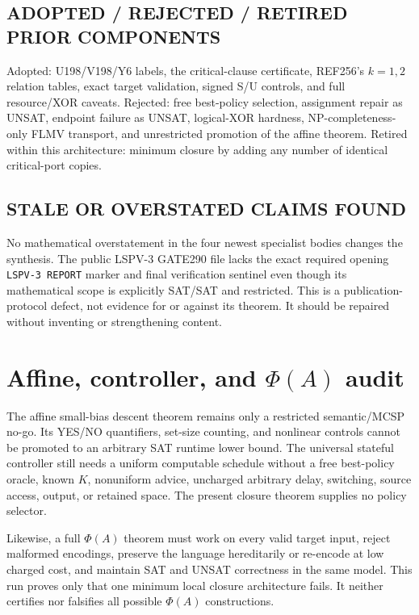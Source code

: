 \documentclass[11pt]{article}
\begin{document}
\subsection*{ADOPTED / REJECTED / RETIRED PRIOR COMPONENTS}
Adopted: U198/V198/Y6 labels, the critical-clause certificate, REF256's $k=1,2$ relation tables, exact target validation, signed S/U controls, and full resource/XOR caveats.  Rejected: free best-policy selection, assignment repair as UNSAT, endpoint failure as UNSAT, logical-XOR hardness, NP-completeness-only FLMV transport, and unrestricted promotion of the affine theorem.  Retired within this architecture: minimum closure by adding any number of identical critical-port copies.

\subsection*{STALE OR OVERSTATED CLAIMS FOUND}
No mathematical overstatement in the four newest specialist bodies changes the synthesis.  The public LSPV-3 GATE290 file lacks the exact required opening \texttt{LSPV-3 REPORT} marker and final verification sentinel even though its mathematical scope is explicitly SAT/SAT and restricted.  This is a publication-protocol defect, not evidence for or against its theorem.  It should be repaired without inventing or strengthening content.

\section{Affine, controller, and $\Phi(A)$ audit}

The affine small-bias descent theorem remains only a restricted semantic/MCSP no-go.  Its YES/NO quantifiers, set-size counting, and nonlinear controls cannot be promoted to an arbitrary SAT runtime lower bound.  The universal stateful controller still needs a uniform computable schedule without a free best-policy oracle, known $K$, nonuniform advice, uncharged arbitrary delay, switching, source access, output, or retained space.  The present closure theorem supplies no policy selector.

Likewise, a full $\Phi(A)$ theorem must work on every valid target input, reject malformed encodings, preserve the language hereditarily or re-encode at low charged cost, and maintain SAT and UNSAT correctness in the same model.  This run proves only that one minimum local closure architecture fails.  It neither certifies nor falsifies all possible $\Phi(A)$ constructions.
\end{document}
